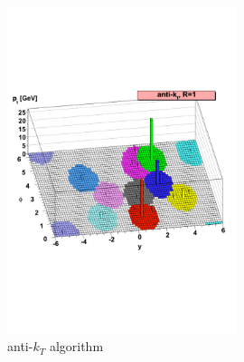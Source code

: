 \begin{figure}[tbp]
\begin{center}
 \includegraphics[width=0.60\textwidth,keepaspectratio]{figures/Reconstruction/antikt}
\caption{
anti-$k_T$ algorithm \cite{Cacciari_2008}
}
\label{fig:antikt}
\end{center}
\end{figure}

